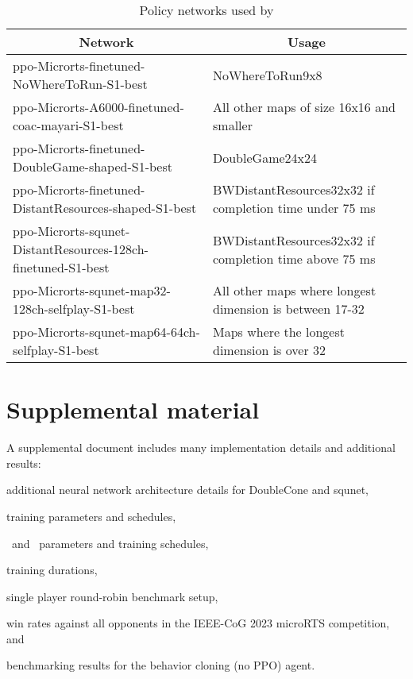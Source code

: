 \documentclass[conference]{IEEEtran}
\begin{document}
\begin{table}[t]
    \caption{Policy networks used by \agentName}
    \label{tab:policy-networks}
    \begin{center}
        \begin{tabular}{p{0.5\linewidth}p{0.5\linewidth}}
            \multicolumn{1}{c}{\bf Network}  &\multicolumn{1}{c}{\bf Usage} \\
            \midrule
            ppo-Microrts-finetuned-NoWhereToRun-S1-best & NoWhereToRun9x8 \\ \hline
            ppo-Microrts-A6000-finetuned-coac-mayari-S1-best & All other maps of size 16x16 and smaller \\ \hline
            ppo-Microrts-finetuned-DoubleGame-shaped-S1-best & DoubleGame24x24 \\ \hline
            ppo-Microrts-finetuned-DistantResources-shaped-S1-best & BWDistantResources32x32 if completion time under 75 ms \\ \hline
            ppo-Microrts-squnet-DistantResources-128ch-finetuned-S1-best & BWDistantResources32x32 if completion time above 75 ms \\ \hline
            ppo-Microrts-squnet-map32-128ch-selfplay-S1-best & All other maps where longest dimension is between 17-32 \\ \hline
            ppo-Microrts-squnet-map64-64ch-selfplay-S1-best & Maps where the longest
            dimension is over 32 \\
        \end{tabular}
    \end{center}
\end{table}

\section{Supplemental material}
A supplemental document includes many implementation details and additional results:
\begin{inparaenum}[(1)]
    \item additional neural network architecture details for DoubleCone and squnet,
    \item training parameters and schedules,
    \item \bcAgent\ and \bcPPOAgent\ parameters and training schedules,
    \item training durations,
    \item single player round-robin benchmark setup,
    \item win rates against all opponents in the IEEE-CoG 2023 microRTS competition, and
    \item benchmarking results for the behavior cloning (no PPO) agent.
\end{inparaenum}
\end{document}
